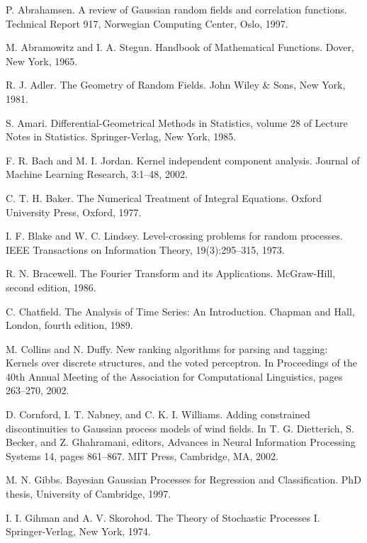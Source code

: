 \documentclass[11pt]{book}
\begin{document}
\begin{thebibliography}{99}
 P. Abrahamsen. A review of Gaussian random fields and correlation functions. Technical Report 917, Norwegian Computing Center, Oslo, 1997.

 M. Abramowitz and I. A. Stegun. Handbook of Mathematical Functions. Dover, New York, 1965.

 R. J. Adler. The Geometry of Random Fields. John Wiley \& Sons, New York, 1981.

 S. Amari. Differential-Geometrical Methods in Statistics, volume 28 of Lecture Notes in Statistics. Springer-Verlag, New York, 1985.

 F. R. Bach and M. I. Jordan. Kernel independent component analysis. Journal of Machine Learning Research, 3:1--48, 2002.

 C. T. H. Baker. The Numerical Treatment of Integral Equations. Oxford University Press, Oxford, 1977.

 I. F. Blake and W. C. Lindsey. Level-crossing problems for random processes. IEEE Transactions on Information Theory, 19(3):295--315, 1973.

 R. N. Bracewell. The Fourier Transform and its Applications. McGraw-Hill, second edition, 1986.

 C. Chatfield. The Analysis of Time Series: An Introduction. Chapman and Hall, London, fourth edition, 1989.

 M. Collins and N. Duffy. New ranking algorithms for parsing and tagging: Kernels over discrete structures, and the voted perceptron. In Proceedings of the 40th Annual Meeting of the Association for Computational Linguistics, pages 263--270, 2002.

 D. Cornford, I. T. Nabney, and C. K. I. Williams. Adding constrained discontinuities to Gaussian process models of wind fields. In T. G. Dietterich, S. Becker, and Z. Ghahramani, editors, Advances in Neural Information Processing Systems 14, pages 861--867. MIT Press, Cambridge, MA, 2002.

 M. N. Gibbs. Bayesian Gaussian Processes for Regression and Classification. PhD thesis, University of Cambridge, 1997.

 I. I. Gihman and A. V. Skorohod. The Theory of Stochastic Processes I. Springer-Verlag, New York, 1974.


\end{thebibliography}
\end{document}
